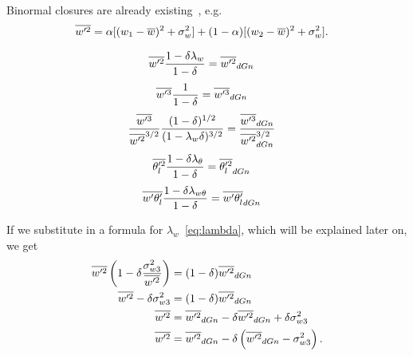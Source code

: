 \documentclass[10pt]{beamer}
\numberwithin{equation}{section}
\begin{document}
    \begin{frame}
        Binormal closures are already existing~\autocite{larson2005using}, e.g.
        \begin{align}
            \label{eq:wp2_bar_dGn}
            \overline{w'^2}
            &= \alpha [(w_1 - \overline{w})^2 + \sigma_w^2]
            + (1 - \alpha) [(w_2 - \overline{w})^2 + \sigma_w^2].
        \end{align}
    \end{frame}

    \begin{frame}
        \begin{align}
            \label{eq:w_prime_2_transform}
            \overline{w'^2} \frac{1 - \delta\lambda_w}{1 - \delta}
            &= \overline{w'^2}_{dGn}
        \end{align}
        \begin{align}
            \label{eq:w_prime_3_transform}
            \overline{w'^3} \frac{1}{1 - \delta}
            &= \overline{w'^3}_{dGn}
        \end{align}
        \begin{align}
            \label{eq:w_prime_3_div_w_prime_2_transform}
            \frac{\overline{w'^3}}{\overline{w'^2}^{3/2}} \frac{(1 - \delta)^{1/2}}{(1 - \lambda_w\delta)^{3/2}}
            &= \frac{\overline{w'^3}_{dGn}}{\overline{w'^2}_{dGn}^{3/2}}
        \end{align}
        \begin{align}
            \label{eq:theta_l_prime_transform}
            \overline{\theta_l'^2} \frac{1 - \delta\lambda_\theta}{1 - \delta}
            &= \overline{\theta_l'^2}_{dGn}
        \end{align}
        \begin{align}
            \label{eq:w_prime_theta_l_prime_transform}
            \overline{w' \theta_l'} \frac{1 - \delta\lambda_{w\theta}}{1 - \delta}
            &= \overline{w' \theta_l'}_{dGn}
        \end{align}
    \end{frame}

    \begin{frame}
        If we substitute in a formula for $\lambda_w$~\eqref{eq:lambda}, which will be explained later on, we get
        \begin{align}
            \overline{w'^2} \left(1 - \delta\frac{\sigma_{w 3}^2}{\overline{w'^2}}\right)
            &= (1 - \delta)\overline{w'^2}_{dGn} \nonumber\\
            \overline{w'^2} - \delta\sigma_{w 3}^2
            &= (1 - \delta)\overline{w'^2}_{dGn} \nonumber\\
            \overline{w'^2}
            &= \overline{w'^2}_{dGn} - \delta\overline{w'^2}_{dGn} + \delta\sigma_{w 3}^2 \nonumber\\
            \overline{w'^2}
            &= \overline{w'^2}_{dGn} - \delta\left(\overline{w'^2}_{dGn} - \sigma_{w 3}^2\right).
        \end{align}
    \end{frame}
\end{document}
